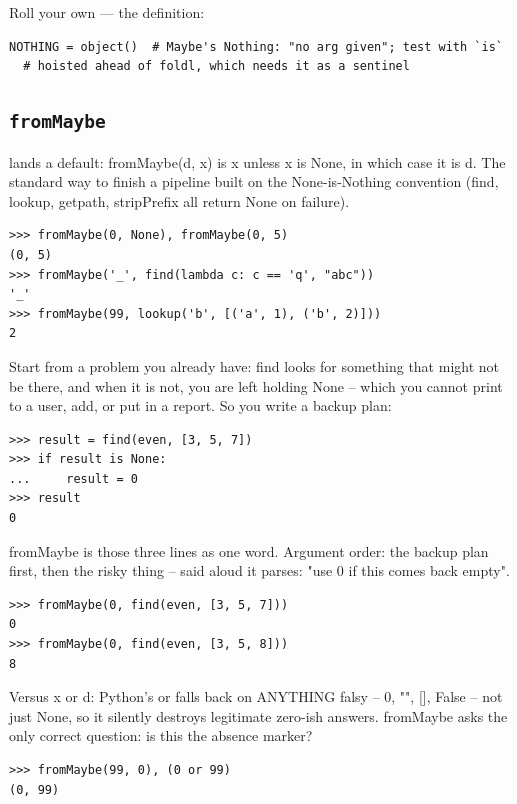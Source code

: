 \documentclass[10pt,letterpaper]{book}
\begin{document}
Roll your own --- the definition:

\begin{lstlisting}[style=ex]
NOTHING = object()  # Maybe's Nothing: "no arg given"; test with `is`
  # hoisted ahead of foldl, which needs it as a sentinel
\end{lstlisting}

\subsection{\texttt{fromMaybe}}\label{def:fromMaybe}
lands a default: fromMaybe(d, x) is x unless x is None, in which case it is d. The standard way to finish a pipeline built on the None-is-Nothing convention (find, lookup, getpath, stripPrefix all return None on failure).
\begin{lstlisting}[style=ex]
>>> fromMaybe(0, None), fromMaybe(0, 5)
(0, 5)
>>> fromMaybe('_', find(lambda c: c == 'q', "abc"))
'_'
>>> fromMaybe(99, lookup('b', [('a', 1), ('b', 2)]))
2
\end{lstlisting}

Start from a problem you already have: find looks for something that might not be there, and when it is not, you are left holding None -- which you cannot print to a user, add, or put in a report. So you write a backup plan:

\begin{lstlisting}[style=ex]
>>> result = find(even, [3, 5, 7])
>>> if result is None:
...     result = 0
>>> result
0
\end{lstlisting}

fromMaybe is those three lines as one word. Argument order: the backup plan first, then the risky thing -- said aloud it parses: "use 0 if this comes back empty".

\begin{lstlisting}[style=ex]
>>> fromMaybe(0, find(even, [3, 5, 7]))
0
>>> fromMaybe(0, find(even, [3, 5, 8]))
8
\end{lstlisting}

Versus x or d: Python's or falls back on ANYTHING falsy -- 0, "", [], False -- not just None, so it silently destroys legitimate zero-ish answers. fromMaybe asks the only correct question: is this the absence marker?

\begin{lstlisting}[style=ex]
>>> fromMaybe(99, 0), (0 or 99)
(0, 99)
\end{lstlisting}
\end{document}
